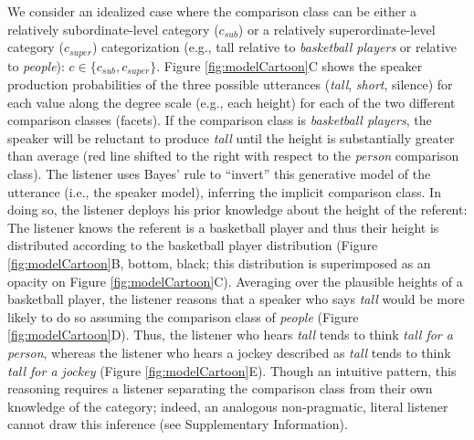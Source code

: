 \documentclass[doc]{apa6}
\begin{document}
  

We consider an idealized case where the comparison class can be either a relatively subordinate-level category ($c_{sub}$) or a relatively superordinate-level category ($c_{super}$) categorization (e.g., tall relative to \emph{basketball players} or relative to \emph{people}): \(c \in \{c_{sub}, c_{super}\}\).
Figure \ref{fig:modelCartoon}C shows the speaker production probabilities of the three possible utterances (\emph{tall}, \emph{short}, silence) for each value along the degree scale (e.g., each height) for each of the two different comparison classes (facets). 
If the comparison class is \emph{basketball players}, the speaker will be reluctant to produce \emph{tall} until the height is substantially greater than average (red line shifted to the right with respect to the \emph{person} comparison class). 
The listener uses Bayes' rule to ``invert'' this generative model of the utterance (i.e., the speaker model), inferring the implicit comparison class.
In doing so, the listener deploys his prior knowledge about the height of the referent: The listener knows the referent is a basketball player and thus their height is distributed according to the basketball player distribution (Figure \ref{fig:modelCartoon}B, bottom, black; this distribution is superimposed as an opacity on Figure \ref{fig:modelCartoon}C).
Averaging over the plausible heights of a basketball player, the listener reasons that a speaker who says \emph{tall} would be more likely to do so assuming the comparison class of \emph{people}  (Figure \ref{fig:modelCartoon}D). 
Thus, the listener who hears \emph{tall} tends to think \emph{tall for a person}, whereas the listener who hears a jockey described as \emph{tall} tends to think \emph{tall for a jockey} (Figure \ref{fig:modelCartoon}E).
Though an intuitive pattern, this reasoning requires a listener separating the comparison class from their own knowledge of the category; indeed, an analogous non-pragmatic, literal listener cannot draw this inference (see Supplementary Information).

\end{document}
